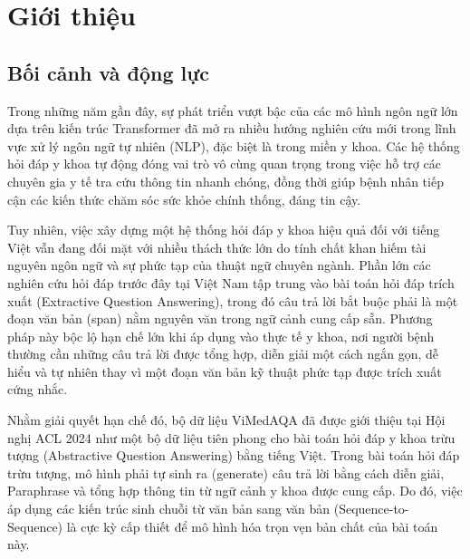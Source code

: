 \chapter{Giới thiệu}
\section{Bối cảnh và động lực}
Trong những năm gần đây, sự phát triển vượt bậc của các mô hình ngôn ngữ lớn dựa trên kiến trúc Transformer \cite{vaswani2017attention} đã mở ra nhiều hướng nghiên cứu mới trong lĩnh vực xử lý ngôn ngữ tự nhiên (NLP), đặc biệt là trong miền y khoa. Các hệ thống hỏi đáp y khoa tự động đóng vai trò vô cùng quan trọng trong việc hỗ trợ các chuyên gia y tế tra cứu thông tin nhanh chóng, đồng thời giúp bệnh nhân tiếp cận các kiến thức chăm sóc sức khỏe chính thống, đáng tin cậy. 

Tuy nhiên, việc xây dựng một hệ thống hỏi đáp y khoa hiệu quả đối với tiếng Việt vẫn đang đối mặt với nhiều thách thức lớn do tính chất khan hiếm tài nguyên ngôn ngữ và sự phức tạp của thuật ngữ chuyên ngành. Phần lớn các nghiên cứu hỏi đáp trước đây tại Việt Nam tập trung vào bài toán hỏi đáp trích xuất (Extractive Question Answering), trong đó câu trả lời bắt buộc phải là một đoạn văn bản (span) nằm nguyên văn trong ngữ cảnh cung cấp sẵn. Phương pháp này bộc lộ hạn chế lớn khi áp dụng vào thực tế y khoa, nơi người bệnh thường cần những câu trả lời được tổng hợp, diễn giải một cách ngắn gọn, dễ hiểu và tự nhiên thay vì một đoạn văn bản kỹ thuật phức tạp được trích xuất cứng nhắc.

Nhằm giải quyết hạn chế đó, bộ dữ liệu ViMedAQA \cite{tran2024vimedaqa} đã được giới thiệu tại Hội nghị ACL 2024 như một bộ dữ liệu tiên phong cho bài toán hỏi đáp y khoa trừu tượng (Abstractive Question Answering) bằng tiếng Việt. Trong bài toán hỏi đáp trừu tượng, mô hình phải tự sinh ra (generate) câu trả lời bằng cách diễn giải, Paraphrase và tổng hợp thông tin từ ngữ cảnh y khoa được cung cấp. Do đó, việc áp dụng các kiến trúc sinh chuỗi từ văn bản sang văn bản (Sequence-to-Sequence) là cực kỳ cấp thiết để mô hình hóa trọn vẹn bản chất của bài toán này.

